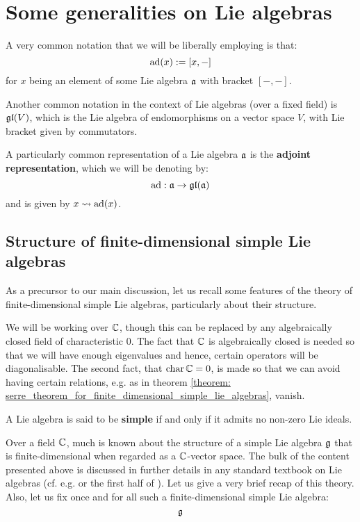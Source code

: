\section{Some generalities on Lie algebras}
    \begin{convention}
        A very common notation that we will be liberally employing is that:
            $$\mathrm{ad}(x) := [x, -]$$
        for $x$ being an element of some Lie algebra $\mathfrak{a}$ with bracket $[-, -]$. 

        Another common notation in the context of Lie algebras (over a fixed field) is $\mathfrak{gl}(V)$, which is the Lie algebra of endomorphisms on a vector space $V$, with Lie bracket given by commutators.

        A particularly common representation of a Lie algebra $\mathfrak{a}$ is the \textbf{adjoint representation}, which we will be denoting by:
            $$\mathrm{ad}: \mathfrak{a} \to \mathfrak{gl}(\mathfrak{a})$$
        and is given by $x \leadsto \mathrm{ad}(x)$.
    \end{convention}

    \subsection{Structure of finite-dimensional simple Lie algebras} \label{subsection: finite_dimensional_simple_lie_algebras}
        As a precursor to our main discussion, let us recall some features of the theory of finite-dimensional simple Lie algebras, particularly about their structure.

        We will be working over $\mathbb{C}$, though this can be replaced by any algebraically closed field of characteristic $0$. The fact that $\mathbb{C}$ is algebraically closed is needed so that we will have enough eigenvalues and hence, certain operators will be diagonalisable. The second fact, that $\operatorname{char} \mathbb{C} = 0$, is made so that we can avoid having certain relations, e.g. as in theorem \ref{theorem: serre_theorem_for_finite_dimensional_simple_lie_algebras}, vanish.

        \begin{definition}
            A Lie algebra is said to be \textbf{simple} if and only if it admits no non-zero Lie ideals. 
        \end{definition}

        Over a field $\mathbb{C}$, much is known about the structure of a simple Lie algebra $\mathfrak{g}$ that is finite-dimensional when regarded as a $\mathbb{C}$-vector space. The bulk of the content presented above is discussed in further details in any standard textbook on Lie algebras (cf. e.g. \cite{humphreys_lie_algebras} or the first half of \cite{carter_affine_lie_algebras}). Let us give a very brief recap of this theory. Also, let us fix once and for all such a finite-dimensional simple Lie algebra:
            $$\mathfrak{g}$$

